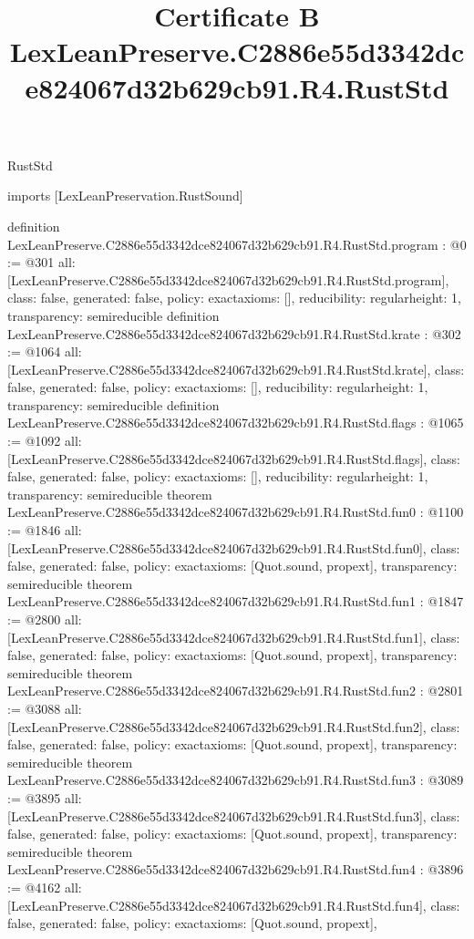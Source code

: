 \begin{lexlean}{RustStd}
\title{Certificate B LexLeanPreserve.C2886e55d3342dce824067d32b629cb91.R4.RustStd}
\begin{coremodule}
imports [LexLeanPreservation.RustSound]

definition LexLeanPreserve.C2886e55d3342dce824067d32b629cb91.R4.RustStd.program : @0 := @301 {
  all: [LexLeanPreserve.C2886e55d3342dce824067d32b629cb91.R4.RustStd.program],
  class: false,
  generated: false,
  policy: exact{axioms: []},
  reducibility: regular{height: 1},
  transparency: semireducible
}
definition LexLeanPreserve.C2886e55d3342dce824067d32b629cb91.R4.RustStd.krate : @302 := @1064 {
  all: [LexLeanPreserve.C2886e55d3342dce824067d32b629cb91.R4.RustStd.krate],
  class: false,
  generated: false,
  policy: exact{axioms: []},
  reducibility: regular{height: 1},
  transparency: semireducible
}
definition LexLeanPreserve.C2886e55d3342dce824067d32b629cb91.R4.RustStd.flags : @1065 := @1092 {
  all: [LexLeanPreserve.C2886e55d3342dce824067d32b629cb91.R4.RustStd.flags],
  class: false,
  generated: false,
  policy: exact{axioms: []},
  reducibility: regular{height: 1},
  transparency: semireducible
}
theorem LexLeanPreserve.C2886e55d3342dce824067d32b629cb91.R4.RustStd.fun0 : @1100 := @1846 {
  all: [LexLeanPreserve.C2886e55d3342dce824067d32b629cb91.R4.RustStd.fun0],
  class: false,
  generated: false,
  policy: exact{axioms: [Quot.sound, propext]},
  transparency: semireducible
}
theorem LexLeanPreserve.C2886e55d3342dce824067d32b629cb91.R4.RustStd.fun1 : @1847 := @2800 {
  all: [LexLeanPreserve.C2886e55d3342dce824067d32b629cb91.R4.RustStd.fun1],
  class: false,
  generated: false,
  policy: exact{axioms: [Quot.sound, propext]},
  transparency: semireducible
}
theorem LexLeanPreserve.C2886e55d3342dce824067d32b629cb91.R4.RustStd.fun2 : @2801 := @3088 {
  all: [LexLeanPreserve.C2886e55d3342dce824067d32b629cb91.R4.RustStd.fun2],
  class: false,
  generated: false,
  policy: exact{axioms: [Quot.sound, propext]},
  transparency: semireducible
}
theorem LexLeanPreserve.C2886e55d3342dce824067d32b629cb91.R4.RustStd.fun3 : @3089 := @3895 {
  all: [LexLeanPreserve.C2886e55d3342dce824067d32b629cb91.R4.RustStd.fun3],
  class: false,
  generated: false,
  policy: exact{axioms: [Quot.sound, propext]},
  transparency: semireducible
}
theorem LexLeanPreserve.C2886e55d3342dce824067d32b629cb91.R4.RustStd.fun4 : @3896 := @4162 {
  all: [LexLeanPreserve.C2886e55d3342dce824067d32b629cb91.R4.RustStd.fun4],
  class: false,
  generated: false,
  policy: exact{axioms: [Quot.sound, propext]},
}
\end{coremodule}
\end{lexlean}
